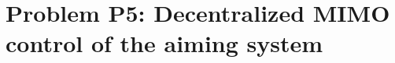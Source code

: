 \documentclass{tron}
\begin{document}
\maketitle
 \tableofcontents
\clearpage
{}
\setcounter{page}{1}
\setlength{\parskip}{5pt}
\newpage


\section{Problem P5: Decentralized MIMO control of the aiming system}
\end{document}
